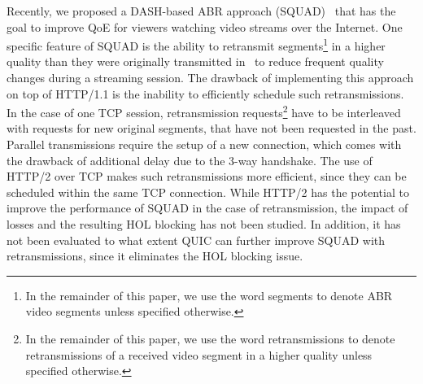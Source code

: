 Recently, we proposed a DASH-based ABR approach (SQUAD)~\cite{WangRZ16} that has the goal to improve QoE for viewers watching video streams over the Internet. One specific feature of SQUAD is the ability to retransmit segments\footnote{In the remainder of this paper, we use the word segments to denote ABR video segments unless specified otherwise.} in a higher quality than they were originally transmitted in~\cite{Wang:TOMM:2017} to reduce frequent quality changes during a streaming session. 
The drawback of implementing this approach on top of HTTP/1.1 is the inability to efficiently schedule such retransmissions. In the case of one TCP session, retransmission requests\footnote{In the remainder of this paper, we use the word retransmissions to denote retransmissions of a received video segment in a higher quality unless specified otherwise.} have to be interleaved with requests for new original segments, that have not been requested in the past. Parallel transmissions require the setup of a new connection, which comes with the drawback of additional delay due to the 3-way handshake.
The use of HTTP/2 over TCP makes such retransmissions more efficient, since they can be scheduled within the same TCP connection. 
While HTTP/2 has the potential to improve the performance of SQUAD in the case of retransmission, the impact of losses and the resulting HOL blocking has not been studied. 
In addition, it has not been evaluated to what extent QUIC can further improve SQUAD with retransmissions, since it eliminates the HOL blocking issue. 

